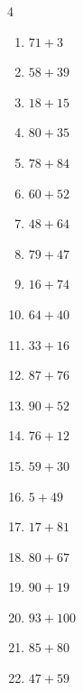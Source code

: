 \begin{multicols}{4}
\begin{enumerate}
  \item $71+3$
        \phantom{$=74$}

  \item $58+39$
        \phantom{$=97$}

  \item $18+15$
        \phantom{$=33$}

  \item $80+35$
        \phantom{$=115$}

  \item $78+84$
        \phantom{$=162$}

  \item $60+52$
        \phantom{$=112$}

  \item $48+64$
        \phantom{$=112$}

  \item $79+47$
        \phantom{$=126$}

  \item $16+74$
        \phantom{$=90$}

  \item $64+40$
        \phantom{$=104$}

  \item $33+16$
        \phantom{$=49$}

  \item $87+76$
        \phantom{$=163$}

  \item $90+52$
        \phantom{$=142$}

  \item $76+12$
        \phantom{$=88$}

  \item $59+30$
        \phantom{$=89$}

  \item $5+49$
        \phantom{$=54$}

  \item $17+81$
        \phantom{$=98$}

  \item $80+67$
        \phantom{$=147$}

  \item $90+19$
        \phantom{$=109$}

  \item $93+100$
        \phantom{$=193$}

  \item $85+80$
        \phantom{$=165$}

  \item $47+59$
        \phantom{$=106$}


\end{enumerate}
\end{multicols}
